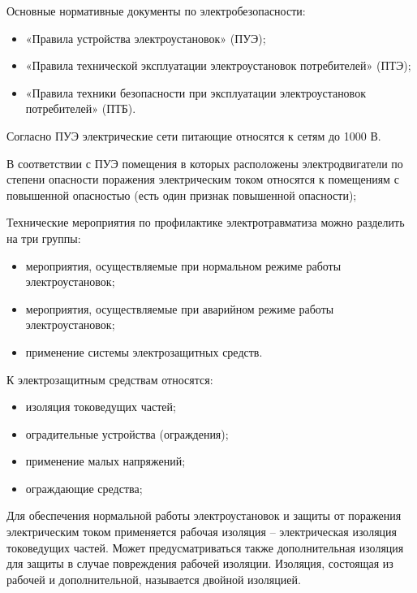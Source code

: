         Основные нормативные документы по электробезопасности:
        \begin{itemize}
            \item «Правила устройства электроустановок» (ПУЭ);
            \item «Правила технической эксплуатации электроустановок
                потребителей» (ПТЭ);
            \item «Правила техники безопасности при эксплуатации
                электроустановок потребителей» (ПТБ).
        \end{itemize}

        Согласно ПУЭ электрические сети питающие относятся к сетям до 1000 В.

        В соответствии с ПУЭ помещения в которых расположены электродвигатели
        по степени опасности поражения электрическим током относятся к
        помещениям с повышенной опасностью (есть один признак повышенной
        опасности); 

        Технические мероприятия по профилактике электротравматиза можно
        разделить на три группы: 
        \begin{itemize}
            \item мероприятия, осуществляемые при нормальном режиме работы
                электроустановок;
            \item мероприятия, осуществляемые при аварийном режиме работы
                электроустановок;
            \item применение системы электрозащитных средств.
        \end{itemize}

        К электрозащитным средствам относятся:
        \begin{itemize}
            \item изоляция токоведущих частей;
            \item оградительные устройства (ограждения);
            \item применение малых напряжений;
            \item ограждающие средства;
        \end{itemize}

        Для обеспечения нормальной работы электроустановок и защиты от
        поражения электрическим током применяется рабочая изоляция –
        электрическая изоляция токоведущих частей. Может предусматриваться
        также дополнительная изоляция для защиты в случае повреждения рабочей
        изоляции. Изоляция, состоящая из рабочей и дополнительной, называется
        двойной изоляцией.

